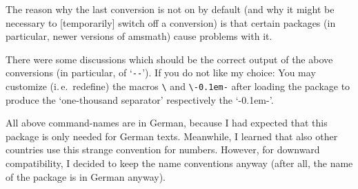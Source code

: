 \documentclass[pagesize=auto]{scrartcl}
\makeatletter
\newcommand*{\pkg}[1]{\textsf{#1}}
\newcommand*{\cs}[1]{\texttt{\textbackslash#1}}
\newcommand*{\cmd}[1]{\cs{\expandafter\@gobble\string#1}}
\newcommand*{\ZifferStrich}{\textrm{-\kern0.1em-}}
\makeatother
\begin{document}
The reason why the last conversion is not on by default (and why it might be
necessary to [temporarily] switch off a conversion) is that certain packages
(in particular, newer versions of \pkg{amsmath}) cause problems with it.

There were some discussions which should be the correct output of the
above conversions (in particular, of `\texttt{-{}-}').
If you do not like my choice: You may customize (i.\,e.\ redefine) the macros
\cmd{\ZifferLeer} and \cmd{\ZifferStrich}
after loading the package to produce the `one-thousand separator'
respectively the `\ZifferStrich'.

All above command-names are in German, because I had expected that this
package is only needed for German texts. Meanwhile, I learned that also
other countries use this strange convention for numbers. However, for
downward compatibility, I decided to keep the name conventions anyway
(after all, the name of the package is in German anyway).
\end{document}
